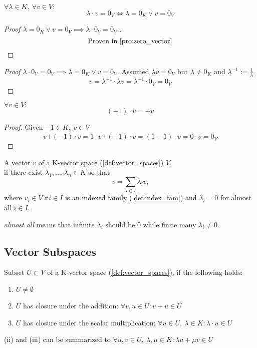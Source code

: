 \begin{proposition}[\(\lambda \cdot v = 0_V\)]
   \(\forall \lambda \in K,~\forall v \in V:\)
   \[\lambda \cdot v = 0_V \iff \lambda = 0_K \lor v = 0_V\]
\end{proposition}
\begin{proof}[Proof \(\lambda = 0_K \lor v = 0_V \implies \lambda \cdot 0_V = 0_V\).]
   \[\text{Proven in \cref{pro:zero_vector}}\]
\end{proof}
\begin{proof}[Proof \(\lambda \cdot 0_V = 0_V \implies \lambda = 0_K \lor v = 0_V\)]
   Assumed \(\lambda v = 0_V\) but \(\lambda \neq 0_K\) and \(\lambda^{-1} := \frac{1}{\lambda}\)
   \[v = \lambda^{-1} \cdot \lambda v = \lambda^{-1} \cdot 0_V = 0_V\]
\end{proof}

\begin{proposition}[Inverse of \(v\)]
   \(\forall v \in V:\)
   \[(-1) \cdot v = -v\]
\end{proposition}
\begin{proof}
   Given \(-1 \in K,~ v \in V\)
   \[v \dot{+} (-1) \cdot v = 1 \cdot v \dot{+} (-1) \cdot v = (1 - 1) \cdot v = 0 \cdot v = 0_V\]
\end{proof}

\begin{definition}\label{def:lin_comb}
   A vector \(v\) of a K-vector space (\ref{def:vector_spaces}) \(V\), \\
   if there exist \(\lambda_1, \ldots, \lambda_n \in K\) so that
   \[v = \sum_{i \in I} \lambda_i v_i\]
   where \(v_i \in V~\forall i \in I\) is an indexed family (\ref{def:index_fam}) and \(\lambda_i = 0\) for almost all \(i \in I\).
\end{definition}
\begin{remark}
   \textit{almost all} means that infinite \(\lambda_i\) should be 0 while finite many \(\lambda_i \neq 0\).
\end{remark}

\subsection{Vector Subspaces}
\begin{definition}\label{def:vector_subspace}
   Subset \(U \subset V\) of a K-vector space (\ref{def:vector_spaces}), if the following holds:
   \begin{enumerate}[label=(\roman*)]
      \item \(U \neq \emptyset\)
      \item \(U\) has closure under the addition: \(\forall v, u \in U: v + u \in U\)
      \item \(U\) has closure under the scalar multiplication: \(\forall u \in U,~\lambda \in K: \lambda \cdot u \in U\)
   \end{enumerate}
\end{definition}
\begin{remark}
   (ii) and (iii) can be summarized to \(\forall u, v \in U,~\lambda, \mu \in K: \lambda u + \mu v \in U\)
\end{remark}


